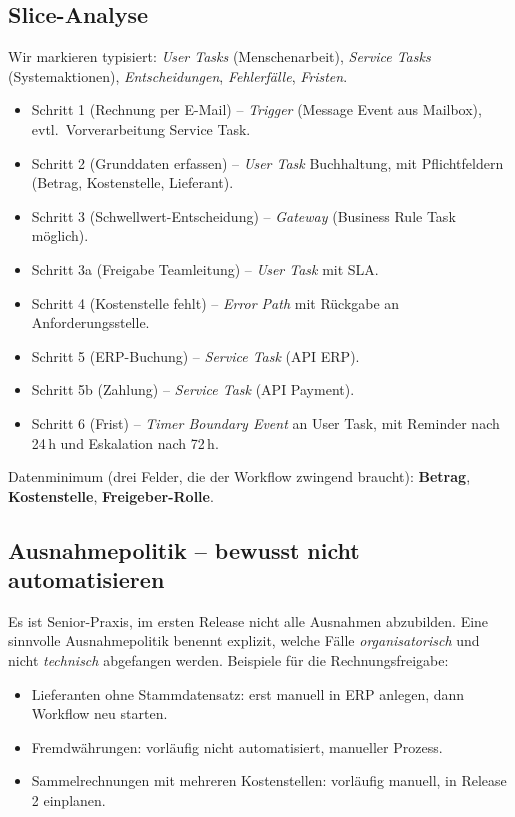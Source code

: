 \documentclass[11pt,a4paper,oneside]{article}
\newcommand{\fachbegriff}[1]{\textbf{#1}}
\begin{document}
\subsection{Slice-Analyse}

Wir markieren typisiert: \textit{User Tasks} (Menschenarbeit), \textit{Service Tasks} (Systemaktionen), \textit{Entscheidungen}, \textit{Fehlerfälle}, \textit{Fristen}.

\begin{itemize}
  \item Schritt 1 (Rechnung per E-Mail) -- \emph{Trigger} (Message Event aus Mailbox), evtl.\ Vorverarbeitung Service Task.
  \item Schritt 2 (Grunddaten erfassen) -- \emph{User Task} Buchhaltung, mit Pflichtfeldern (Betrag, Kostenstelle, Lieferant).
  \item Schritt 3 (Schwellwert-Entscheidung) -- \emph{Gateway} (Business Rule Task möglich).
  \item Schritt 3a (Freigabe Teamleitung) -- \emph{User Task} mit SLA.
  \item Schritt 4 (Kostenstelle fehlt) -- \emph{Error Path} mit Rückgabe an Anforderungsstelle.
  \item Schritt 5 (ERP-Buchung) -- \emph{Service Task} (API ERP).
  \item Schritt 5b (Zahlung) -- \emph{Service Task} (API Payment).
  \item Schritt 6 (Frist) -- \emph{Timer Boundary Event} an User Task, mit Reminder nach 24\,h und Eskalation nach 72\,h.
\end{itemize}

Datenminimum (drei Felder, die der Workflow zwingend braucht): \fachbegriff{Betrag}, \fachbegriff{Kostenstelle}, \fachbegriff{Freigeber-Rolle}.

\subsection{Ausnahmepolitik -- bewusst nicht automatisieren}

Es ist Senior-Praxis, im ersten Release nicht alle Ausnahmen abzubilden. Eine sinnvolle Ausnahmepolitik benennt explizit, welche Fälle \emph{organisatorisch} und nicht \emph{technisch} abgefangen werden. Beispiele für die Rechnungsfreigabe:

\begin{itemize}
  \item Lieferanten ohne Stammdatensatz: erst manuell in ERP anlegen, dann Workflow neu starten.
  \item Fremdwährungen: vorläufig nicht automatisiert, manueller Prozess.
  \item Sammelrechnungen mit mehreren Kostenstellen: vorläufig manuell, in Release 2 einplanen.
\end{itemize}
\end{document}
